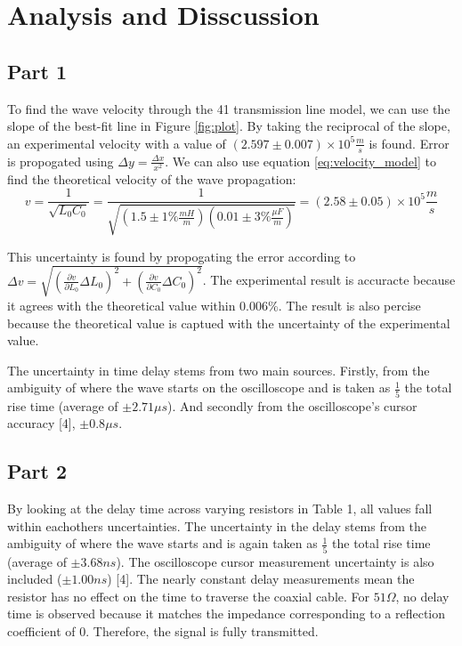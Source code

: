 \documentclass[12pt]{article}
\begin{document}
\section{Analysis and Disscussion}

\subsection*{Part 1}

To find the wave velocity through the 41 transmission line model, we can use the slope of the best-fit line in Figure \ref{fig:plot}.
By taking the reciprocal of the slope, an experimental velocity with a value of $(2.597\pm0.007)\times10^5\frac{m}{s}$ is found. Error is propogated using $\Delta y = \frac{\Delta x}{x^2}$. We can also use equation \ref{eq:velocity_model} to find the theoretical velocity of the wave propagation:
\begin{equation}
    v = \frac{1}{\sqrt{L_0 C_0}} = \frac{1}{\sqrt{(1.5 \pm 1\% \frac{mH}{m})(0.01 \pm3\% \frac{\mu F}{m})}} = (2.58\pm0.05)\times10^5\frac{m}{s}
\end{equation}

This uncertainty is found by propogating the error according to $\Delta v = \sqrt{\left(\frac{\partial v}{\partial L_0}\Delta L_0\right)^2 + \left(\frac{\partial v}{\partial C_0}\Delta C_0\right)^2}$.
The experimental result is accuracte because it agrees with the theoretical value within 0.006\%. The result is also percise because the theoretical value is captued with the uncertainty of the experimental value.

The uncertainty in time delay stems from two main sources. Firstly, from the ambiguity of where the wave starts on the oscilloscope and is taken as $\frac{1}{5}$ the total rise time (average of $\pm 2.71\mu s$). And secondly from the oscilloscope's cursor accuracy [4], $\pm 0.8 \mu s$.

\subsection*{Part 2}

By looking at the delay time across varying resistors in Table 1, all values fall within eachothers uncertainties. The uncertainty in the delay stems from the ambiguity of where the wave starts and is again taken as $\frac{1}{5}$ the total rise time (average of $\pm 3.68ns$). The oscilloscope cursor measurement uncertainty is also included ($\pm1.00ns$) [4]. 
The nearly constant delay measurements mean the resistor has no effect on the time to traverse the coaxial cable. 
For $51\Omega$, no delay time is observed because it matches the impedance corresponding to a reflection coefficient of 0. Therefore, the signal is fully transmitted.
\end{document}
